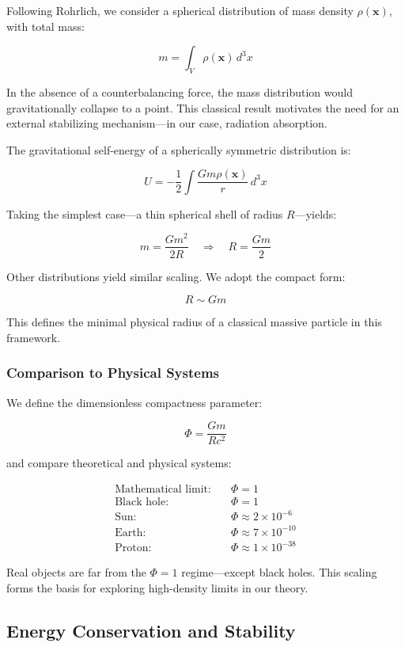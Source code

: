 \documentclass {article}
\renewcommand\vec{\mathbf}
\begin{document}
Following Rohrlich, we consider a spherical distribution of mass density \( \rho(\vec{x}) \), with total mass:

\[
m = \int_V \rho(\vec{x}) \, d^3x
\]

In the absence of a counterbalancing force, the mass distribution would gravitationally collapse to a point. This classical result motivates the need for an external stabilizing mechanism—in our case, radiation absorption.

The gravitational self-energy of a spherically symmetric distribution is:

\[
U = -\frac{1}{2} \int \frac{G m \rho(\vec{x})}{r} \, d^3x
\]

Taking the simplest case—a thin spherical shell of radius \( R \)—yields:

\[
m = \frac{G m^2}{2 R} \quad \Rightarrow \quad R = \frac{G m}{2}
\]

Other distributions yield similar scaling. We adopt the compact form:

\[
R \sim G m
\]

This defines the minimal physical radius of a classical massive particle in this framework.

\subsubsection*{Comparison to Physical Systems}

We define the dimensionless compactness parameter:

\[
\Phi = \frac{G m}{R c^2}
\]

and compare theoretical and physical systems:

\begin{align*}
\text{Mathematical limit:} & \quad \Phi = 1 \\
\text{Black hole:} & \quad \Phi = 1 \\
\text{Sun:} & \quad \Phi \approx 2 \times 10^{-6} \\
\text{Earth:} & \quad \Phi \approx 7 \times 10^{-10} \\
\text{Proton:} & \quad \Phi \approx 1 \times 10^{-38}
\end{align*}

Real objects are far from the \( \Phi = 1 \) regime—except black holes. This scaling forms the basis for exploring high-density limits in our theory.

\subsection{Energy Conservation and Stability}
\end{document}
